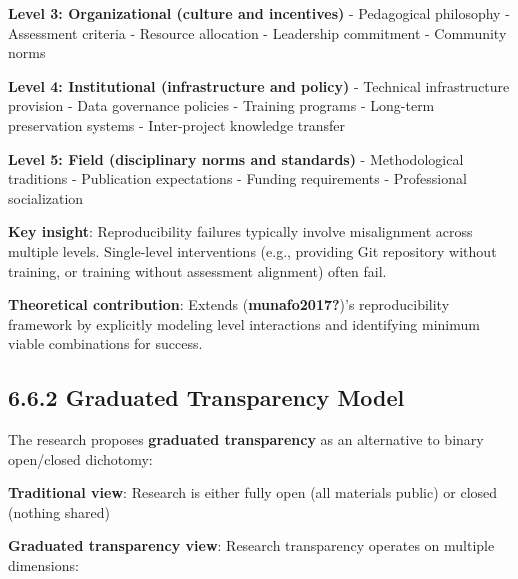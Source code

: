 \documentclass[
  oneside,
  open=any]{scrbook}
\begin{document}
\textbf{Level 3: Organizational (culture and incentives)} - Pedagogical
philosophy - Assessment criteria - Resource allocation - Leadership
commitment - Community norms

\textbf{Level 4: Institutional (infrastructure and policy)} - Technical
infrastructure provision - Data governance policies - Training programs
- Long-term preservation systems - Inter-project knowledge transfer

\textbf{Level 5: Field (disciplinary norms and standards)} -
Methodological traditions - Publication expectations - Funding
requirements - Professional socialization

\textbf{Key insight}: Reproducibility failures typically involve
misalignment across multiple levels. Single-level interventions (e.g.,
providing Git repository without training, or training without
assessment alignment) often fail.

\textbf{Theoretical contribution}: Extends (\textbf{munafo2017?})'s
reproducibility framework by explicitly modeling level interactions and
identifying minimum viable combinations for success.

\subsection{6.6.2 Graduated Transparency
Model}\label{graduated-transparency-model}

The research proposes \textbf{graduated transparency} as an alternative
to binary open/closed dichotomy:

\textbf{Traditional view}: Research is either fully open (all materials
public) or closed (nothing shared)

\textbf{Graduated transparency view}: Research transparency operates on
multiple dimensions:
\end{document}
